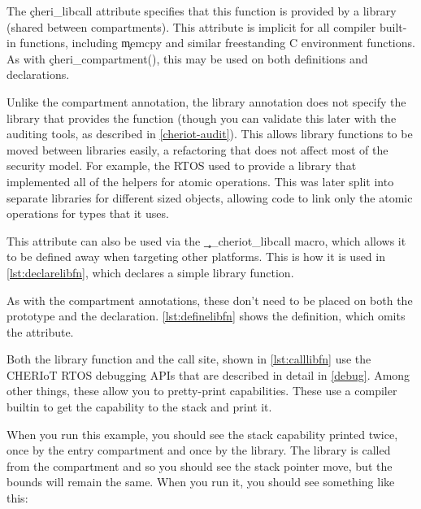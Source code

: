 {{The \c{cheri_libcall} attribute specifies that this function is provided by a library (shared between compartments).
This attribute is implicit for all compiler built-in functions, including \c{memcpy} and similar freestanding C environment functions.
As with \c{cheri_compartment()}, this may be used on both definitions and declarations.

Unlike the compartment annotation, the library annotation does not specify the library that provides the function (though you can validate this later with the auditing tools, as described in \ref{cheriot-audit}).
This allows library functions to be moved between libraries easily, a refactoring that does not affect most of the security model.
For example, the RTOS used to provide a library that implemented all of the helpers for atomic operations.
This was later split into separate libraries for different sized objects, allowing code to link only the atomic operations for types that it uses.

This attribute can also be used via the \c{__cheriot_libcall} macro, which allows it to be defined away when targeting other platforms.
This is how it is used in \ref{lst:declarelibfn}, which declares a simple library function.

\codelisting[filename=examples/library_annotation/interface.h,marker=library_export,label=lst:declarelibfn,caption="A declaration of a library function"]{}

As with the compartment annotations, these don't need to be placed on both the prototype and the declaration.
\ref{lst:definelibfn} shows the definition, which omits the attribute.

\codelisting[filename=examples/library_annotation/library.cc,marker=library_implementation,label=lst:definelibfn,caption="A definition of a library function"]{}

Both the library function and the call site, shown in \ref{lst:calllibfn} use the CHERIoT RTOS debugging APIs that are described in detail in \ref{debug}.
Among other things, these allow you to pretty-print capabilities.
These use a compiler builtin to get the capability to the stack and print it.

\codelisting[filename=examples/library_annotation/entry.cc,marker=entry,label=lst:calllibfn,caption="Calling a simple library function."]{}

When you run this example, you should see the stack capability printed twice, once by the entry compartment and once by the library.
The library is called from the compartment and so you should see the stack pointer move, but the bounds will remain the same.
When you run it, you should see something like this:

}}
